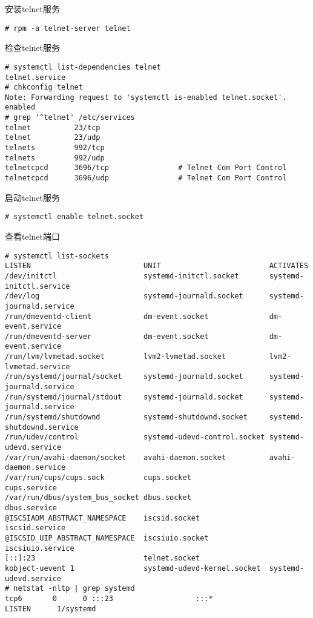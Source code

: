 \begin{compactitem}
\item 安装telnet服务

\begin{verbatim}
# rpm -a telnet-server telnet
\end{verbatim}

\item 检查telnet服务

\begin{verbatim}
# systemctl list-dependencies telnet
telnet.service
# chkconfig telnet
Note: Forwarding request to 'systemctl is-enabled telnet.socket'.
enabled
# grep '^telnet' /etc/services 
telnet          23/tcp
telnet          23/udp
telnets         992/tcp
telnets         992/udp
telnetcpcd      3696/tcp                # Telnet Com Port Control
telnetcpcd      3696/udp                # Telnet Com Port Control
\end{verbatim}

\item 启动telnet服务

\begin{verbatim}
# systemctl enable telnet.socket
\end{verbatim}

\item 查看telnet端口

\begin{verbatim}
# systemctl list-sockets 
LISTEN                          UNIT                         ACTIVATES
/dev/initctl                    systemd-initctl.socket       systemd-initctl.service
/dev/log                        systemd-journald.socket      systemd-journald.service
/run/dmeventd-client            dm-event.socket              dm-event.service
/run/dmeventd-server            dm-event.socket              dm-event.service
/run/lvm/lvmetad.socket         lvm2-lvmetad.socket          lvm2-lvmetad.service
/run/systemd/journal/socket     systemd-journald.socket      systemd-journald.service
/run/systemd/journal/stdout     systemd-journald.socket      systemd-journald.service
/run/systemd/shutdownd          systemd-shutdownd.socket     systemd-shutdownd.service
/run/udev/control               systemd-udevd-control.socket systemd-udevd.service
/var/run/avahi-daemon/socket    avahi-daemon.socket          avahi-daemon.service
/var/run/cups/cups.sock         cups.socket                  cups.service
/var/run/dbus/system_bus_socket dbus.socket                  dbus.service
@ISCSIADM_ABSTRACT_NAMESPACE    iscsid.socket                iscsid.service
@ISCSID_UIP_ABSTRACT_NAMESPACE  iscsiuio.socket              iscsiuio.service
[::]:23                         telnet.socket               
kobject-uevent 1                systemd-udevd-kernel.socket  systemd-udevd.service
# netstat -nltp | grep systemd
tcp6       0      0 :::23                   :::*                    LISTEN      1/systemd 
\end{verbatim}


\end{compactitem}
